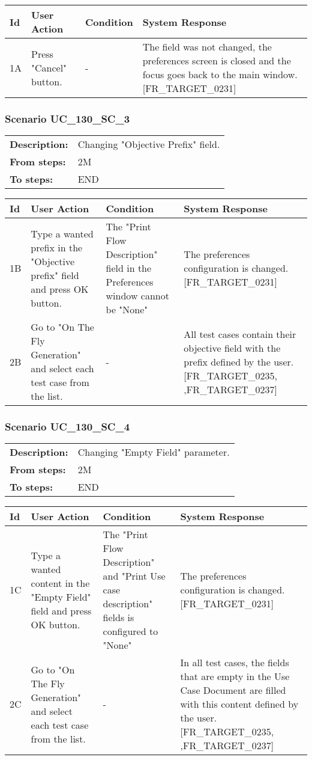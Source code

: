 \documentclass[a4paper,11pt]{article}
\newcommand{\bl}{\\ \hline}
\begin{document}
\begin{tabular}{|p{0.8in}|p{1.6in}|p{1.6in}|p{1.6in}|}
\hline
Id & User Action & Condition & System Response  \bl 
1A & Press "Cancel" button. & - & The field was not changed, the preferences screen is closed and the focus goes back to the main window. [FR_TARGET_0231] \bl 
\end{tabular}
\subsubsection*{Scenario UC_130_SC_3}
\begin{tabular}{p{1in}p{4in}}
{\bf Description:} & Changing "Objective Prefix" field. \\
{\bf From steps:} & 2M \\
{\bf To steps:} & END \\
\end{tabular}
 
\begin{tabular}{|p{0.8in}|p{1.6in}|p{1.6in}|p{1.6in}|}
\hline
Id & User Action & Condition & System Response  \bl 
1B & Type a wanted prefix in the "Objective prefix" field and press OK button. & The "Print Flow Description" field in the Preferences window  cannot be "None" & The preferences configuration is changed. [FR_TARGET_0231] \bl 
2B & Go to "On The Fly Generation" and select each test case from the list. & - & All test cases contain their objective field with the prefix defined by the user. [FR_TARGET_0235, ,FR_TARGET_0237] \bl 
\end{tabular}
\subsubsection*{Scenario UC_130_SC_4}
\begin{tabular}{p{1in}p{4in}}
{\bf Description:} & Changing "Empty Field" parameter. \\
{\bf From steps:} & 2M \\
{\bf To steps:} & END \\
\end{tabular}
 
\begin{tabular}{|p{0.8in}|p{1.6in}|p{1.6in}|p{1.6in}|}
\hline
Id & User Action & Condition & System Response  \bl 
1C & Type a wanted content in the "Empty Field" field and press OK button. & The "Print Flow Description" and "Print Use case description" fields is configured to "None" & The preferences configuration is changed. [FR_TARGET_0231] \bl 
2C & Go to "On The Fly Generation" and select each test case from the list. & - & In all test cases, the fields that are empty in the Use Case Document are filled with this content defined by the user. [FR_TARGET_0235, ,FR_TARGET_0237] \bl 
\end{tabular}
\end{document}
